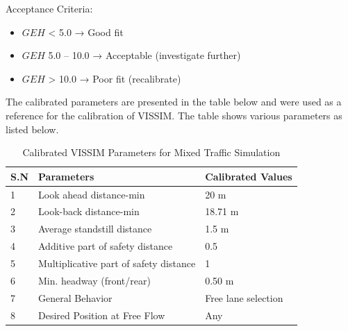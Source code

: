 Acceptance Criteria:
 \begin{itemize}
     \item $GEH$ < 5.0 → Good fit 
     \item $GEH$ 5.0 – 10.0 → Acceptable (investigate further)
     \item $GEH$ > 10.0 → Poor fit  (recalibrate)
\end{itemize}


The calibrated parameters \cite{manandhar2026calibration} are 
presented in the table below and were used as a reference for the 
calibration of VISSIM. The table shows various parameters as listed 
below.


\begin{table}[h]
    \centering
    \caption{Calibrated VISSIM Parameters for Mixed Traffic Simulation}
\begin{tabular}{|l|l|l|}
    \hline
    \textbf{S.N} & \textbf{Parameters} & \textbf{Calibrated Values} \\
    \hline
    1 &	Look ahead distance-min &	20 m \\
    \hline
    2 &	Look-back distance-min	& 18.71 m \\
    \hline
    3 &	Average standstill distance	& 1.5 m \\
    \hline
    4 &	Additive part of safety distance	& 0.5 \\
    \hline
    5 &	Multiplicative part of safety distance	& 1 \\
    \hline
    6 &	Min. headway (front/rear)	& 0.50 m \\
    \hline
    7 &	General Behavior	& Free lane selection \\
    \hline
    8 &	Desired Position at Free Flow &	Any \\
    \hline

    
\end{tabular}
\end{table}